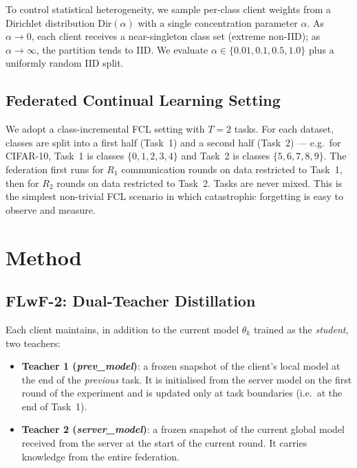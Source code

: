 \documentclass[journal]{IEEEtran}
\begin{document}
To control statistical heterogeneity, we sample per-class client
weights from a Dirichlet distribution $\mathrm{Dir}(\alpha)$ with a
single concentration parameter $\alpha$. As $\alpha\!\to\!0$, each
client receives a near-singleton class set (extreme non-IID); as
$\alpha\!\to\!\infty$, the partition tends to IID. We evaluate
$\alpha\in\{0.01, 0.1, 0.5, 1.0\}$ plus a uniformly random IID split.

\subsection{Federated Continual Learning Setting}

We adopt a class-incremental FCL setting with $T{=}2$ tasks. For each
dataset, classes are split into a first half (Task~1) and a second
half (Task~2) --- e.g.\ for CIFAR-10, Task~1 is classes $\{0,1,2,3,4\}$
and Task~2 is classes $\{5,6,7,8,9\}$. The federation first runs for
$R_1$ communication rounds on data restricted to Task~1, then for
$R_2$ rounds on data restricted to Task~2. Tasks are never mixed.
This is the simplest non-trivial FCL scenario in which catastrophic
forgetting is easy to observe and measure.

\section{Method}
\label{sec:method}

\subsection{FLwF-2: Dual-Teacher Distillation}
\label{ssec:flwf2}

Each client maintains, in addition to the current model $\theta_k$
trained as the \emph{student}, two teachers:

\begin{itemize}
    \item \textbf{Teacher 1 (\emph{prev\_model})}: a frozen snapshot of
        the client's local model at the end of the \emph{previous} task.
        It is initialised from the server model on the first round of
        the experiment and is updated only at task boundaries (i.e.\ at
        the end of Task~1).
    \item \textbf{Teacher 2 (\emph{server\_model})}: a frozen snapshot
        of the current global model received from the server at the
        start of the current round. It carries knowledge from the
        entire federation.
\end{itemize}
\end{document}
